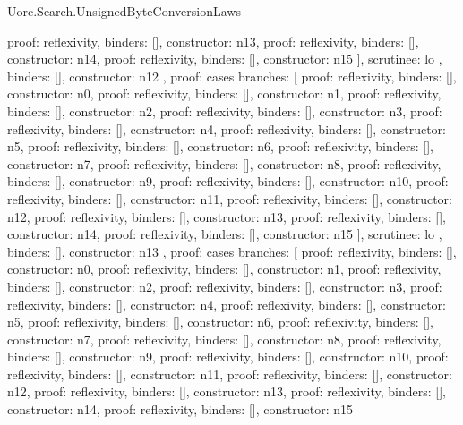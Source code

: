 \begin{lexlean}{Uorc.Search.UnsignedByteConversionLaws}
\begin{semanticmodule}
{{{{            {proof: reflexivity{}, binders: [], constructor: n13},
            {proof: reflexivity{}, binders: [], constructor: n14},
            {proof: reflexivity{}, binders: [], constructor: n15}
          ],
          scrutinee: lo
        },
        binders: [],
        constructor: n12
      },
      {
        proof: cases{
          branches: [
            {proof: reflexivity{}, binders: [], constructor: n0},
            {proof: reflexivity{}, binders: [], constructor: n1},
            {proof: reflexivity{}, binders: [], constructor: n2},
            {proof: reflexivity{}, binders: [], constructor: n3},
            {proof: reflexivity{}, binders: [], constructor: n4},
            {proof: reflexivity{}, binders: [], constructor: n5},
            {proof: reflexivity{}, binders: [], constructor: n6},
            {proof: reflexivity{}, binders: [], constructor: n7},
            {proof: reflexivity{}, binders: [], constructor: n8},
            {proof: reflexivity{}, binders: [], constructor: n9},
            {proof: reflexivity{}, binders: [], constructor: n10},
            {proof: reflexivity{}, binders: [], constructor: n11},
            {proof: reflexivity{}, binders: [], constructor: n12},
            {proof: reflexivity{}, binders: [], constructor: n13},
            {proof: reflexivity{}, binders: [], constructor: n14},
            {proof: reflexivity{}, binders: [], constructor: n15}
          ],
          scrutinee: lo
        },
        binders: [],
        constructor: n13
      },
      {
        proof: cases{
          branches: [
            {proof: reflexivity{}, binders: [], constructor: n0},
            {proof: reflexivity{}, binders: [], constructor: n1},
            {proof: reflexivity{}, binders: [], constructor: n2},
            {proof: reflexivity{}, binders: [], constructor: n3},
            {proof: reflexivity{}, binders: [], constructor: n4},
            {proof: reflexivity{}, binders: [], constructor: n5},
            {proof: reflexivity{}, binders: [], constructor: n6},
            {proof: reflexivity{}, binders: [], constructor: n7},
            {proof: reflexivity{}, binders: [], constructor: n8},
            {proof: reflexivity{}, binders: [], constructor: n9},
            {proof: reflexivity{}, binders: [], constructor: n10},
            {proof: reflexivity{}, binders: [], constructor: n11},
            {proof: reflexivity{}, binders: [], constructor: n12},
            {proof: reflexivity{}, binders: [], constructor: n13},
            {proof: reflexivity{}, binders: [], constructor: n14},
            {proof: reflexivity{}, binders: [], constructor: n15}
}}}}
\end{semanticmodule}
\end{lexlean}
